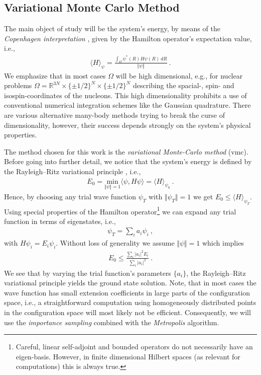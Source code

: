 \documentclass[11pt,a4paper]{article}
\numberwithin{equation}{section}
\begin{document}
\subsection{Variational Monte Carlo Method}
%
%
The main object of study will be the system's energy, by means of the {\it Copenhagen interpretation} \cite{heisenberg1963kopenhager}, given by the Hamilton operator's expectation value, i.e.,
\begin{align*}
\langle H \rangle_{\psi} = \frac{\int_{\Omega}\psi^*(R) H \psi(R)\, dR}{\Vert \psi \Vert}~.
\end{align*}
We emphasize that in most cases $\Omega$ will be high dimensional, e.g., for nuclear problems $\Omega = \mathbb{R}^{3N}\times \{\pm 1/2\}^{N} \times \{\pm 1/2\}^{N}$ describing the spacial-, spin- and isospin-coordinates of the nucleons. 
%
This high dimensionality prohibits a use of conventional numerical integration schemes like the Gaussian quadrature.
%
There are various alternative many-body methods trying to break the curse of dimensionality, however, their success depends strongly on the system's physical properties.

%
The method chosen for this work is the {\it variational Monte-Carlo method} (vmc). Before going into further detail, we notice that the system's energy is defined by the Rayleigh--Ritz variational principle \cite{yserentant2013short}, i.e.,
\begin{align*}
E_0 = \underset{\Vert \psi \Vert=1}{\mathrm{min}}\langle \psi ,H \psi\rangle=\langle H \rangle_{\psi_0} ~.
\end{align*} 
Hence, by choosing any trial wave function $\psi_T$ with $\Vert \psi_T\Vert =1$ we get $E_0\leq \langle H \rangle_{\psi_T }$.
%
Using special properties of the Hamilton operator\footnote{
Careful, linear self-adjoint and bounded operators do not necessarily have an eigen-basis. However, in finite dimensional Hilbert spaces (as relevant for computations) this is always true.
} we can expand any trial function in terms of eigenstates, i.e.,
\begin{align*}
\psi_T=\sum_{i}a_i\psi_i~,
\end{align*}
with $H\psi_i = E_i \psi_i$.
%
Without loss of generality we assume $\Vert \psi \Vert = 1$ which implies
\begin{align*}
E_0\leq \frac{\sum_{i}|a_i|^2E_i}{\sum_{i}|a_i|^2}~.
\end{align*}
We see that by varying the trial function's parameters $\{a_i\}$, the Rayleigh--Ritz variational principle yields the ground state solution.
%
Note, that in most cases the wave function has small extension coefficients in large parts of the configuration space, i.e., a straightforward computation using homogeneously distributed points in the configuration space will most likely not be efficient.  
%
Consequently, we will use the \textit{importance sampling} combined with the \textit{Metropolis} algorithm.
\end{document}
